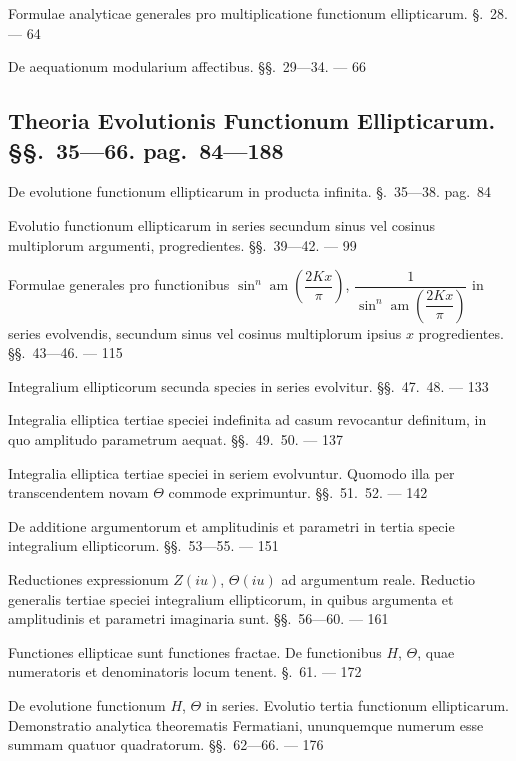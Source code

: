 \documentclass{article}
\begin{document}
Formulae analyticae generales pro multiplicatione functionum ellipticarum. §.\ 28. --- 64

De aequationum modularium affectibus. §§.\ 29---34. --- 66


\subsection*{Theoria Evolutionis Functionum Ellipticarum. §§.\ 35---66. pag.\ 84---188}

De evolutione functionum ellipticarum in producta infinita. §.\ 35---38. pag.\ 84

Evolutio functionum ellipticarum in series secundum sinus vel cosinus multiplorum argumenti, progredientes. §§.\ 39---42. --- 99

Formulae generales pro functionibus $\sin^{n}\operatorname{am}\left(\dfrac{2Kx}{\pi}\right)$, $\dfrac{1}{\sin^{n}\operatorname{am}\left(\dfrac{2Kx}{\pi}\right)}$ in series evolvendis, secundum sinus vel cosinus multiplorum ipsius $x$ progredientes. §§.\ 43---46. --- 115

Integralium ellipticorum secunda species in series evolvitur. §§.\ 47.\ 48. --- 133

Integralia elliptica tertiae speciei indefinita ad casum revocantur definitum, in quo amplitudo parametrum aequat. §§.\ 49.\ 50. --- 137

Integralia elliptica tertiae speciei in seriem evolvuntur. Quomodo illa per transcendentem novam $\Theta$ commode exprimuntur. §§.\ 51.\ 52. --- 142

De additione argumentorum et amplitudinis et parametri in tertia specie integralium ellipticorum. §§.\ 53---55. --- 151

Reductiones expressionum $Z(iu)$, $\Theta(iu)$ ad argumentum reale. Reductio generalis tertiae speciei integralium ellipticorum, in quibus argumenta et amplitudinis et parametri imaginaria sunt. §§.\ 56---60. --- 161

Functiones ellipticae sunt functiones fractae. De functionibus $H$, $\Theta$, quae numeratoris et denominatoris locum tenent. §.\ 61. --- 172

De evolutione functionum $H$, $\Theta$ in series. Evolutio tertia functionum ellipticarum. Demonstratio analytica theorematis Fermatiani, ununquemque numerum esse summam quatuor quadratorum. §§.\ 62---66. --- 176

\end{document}
